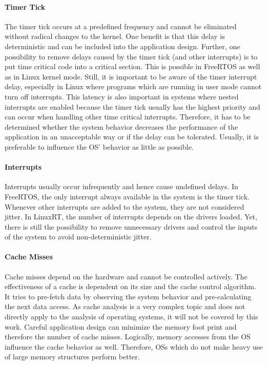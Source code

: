 \paragraph{Timer Tick} 
The timer tick occurs at a predefined frequency and cannot be eliminated without radical changes to the kernel.
One benefit is that this delay is deterministic and can be included into the application design. 
Further, one possibility to remove delays caused by the timer tick (and other interrupts) is to put time critical code into a critical section.
This is possible in FreeRTOS as well as in Linux kernel mode.
Still, it is important to be aware of the timer interrupt delay, especially in Linux where programs which are running in user mode cannot turn off interrupts. 
This latency is also important in systems where nested interrupts are enabled because the timer tick usually has the highest priority and can occur when handling other time critical interrupts. 
Therefore, it has to be determined whether the system behavior decreases the performance of the application in an unacceptable way or if the delay can be tolerated.
Usually, it is preferable to influence the \ac{OS}' behavior as little as possible.         

\paragraph{Interrupts}
Interrupts usually occur infrequently and hence cause undefined delays. 
In FreeRTOS, the only interrupt always available in the system is the timer tick.
Whenever other interrupts are added to the system, they are not considered jitter.
In LinuxRT, the number of interrupts depends on the drivers loaded. 
Yet, there is still the possibility to remove unnecessary drivers and control the inputs of the system to avoid non-deterministic jitter.

\paragraph{Cache Misses}
Cache misses depend on the hardware and cannot be controlled actively.
The effectiveness of a cache is dependent on its size and the cache control algorithm.
It tries to pre-fetch data by observing the system behavior and pre-calculating the next data access.
As cache analysis is a very complex topic and does not directly apply to the analysis of operating systems, it will not be covered by this work.
Careful application design can minimize the memory foot print and therefore the number of cache misses.
Logically, memory accesses from the \ac{OS} influence the cache behavior as well. 
Therefore, \acp{OS} which do not make heavy use of large memory structures perform better. 


